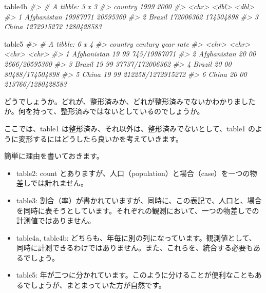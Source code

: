 \documentclass[
  xelatex, ja=standard]{bxjsbook}
\newenvironment{Shaded}{\begin{snugshade}}{\end{snugshade}}
\newcommand{\CommentTok}[1]{\textcolor[rgb]{0.56,0.35,0.01}{\textit{#1}}}
\newcommand{\NormalTok}[1]{#1}
\theoremstyle{definition}
\theoremstyle{definition}
\theoremstyle{definition}
\theoremstyle{definition}
\theoremstyle{remark}
\begin{document}
\begin{Shaded}
\begin{Highlighting}[]
\NormalTok{table4b}
\CommentTok{\#\textgreater{} \# A tibble: 3 x 3}
\CommentTok{\#\textgreater{}   country         \textasciigrave{}1999\textasciigrave{}     \textasciigrave{}2000\textasciigrave{}}
\CommentTok{\#\textgreater{}   \textless{}chr\textgreater{}            \textless{}dbl\textgreater{}      \textless{}dbl\textgreater{}}
\CommentTok{\#\textgreater{} 1 Afghanistan   19987071   20595360}
\CommentTok{\#\textgreater{} 2 Brazil       172006362  174504898}
\CommentTok{\#\textgreater{} 3 China       1272915272 1280428583}
\end{Highlighting}
\end{Shaded}

\begin{Shaded}
\begin{Highlighting}[]
\NormalTok{table5}
\CommentTok{\#\textgreater{} \# A tibble: 6 x 4}
\CommentTok{\#\textgreater{}   country     century year  rate             }
\CommentTok{\#\textgreater{}   \textless{}chr\textgreater{}       \textless{}chr\textgreater{}   \textless{}chr\textgreater{} \textless{}chr\textgreater{}            }
\CommentTok{\#\textgreater{} 1 Afghanistan 19      99    745/19987071     }
\CommentTok{\#\textgreater{} 2 Afghanistan 20      00    2666/20595360    }
\CommentTok{\#\textgreater{} 3 Brazil      19      99    37737/172006362  }
\CommentTok{\#\textgreater{} 4 Brazil      20      00    80488/174504898  }
\CommentTok{\#\textgreater{} 5 China       19      99    212258/1272915272}
\CommentTok{\#\textgreater{} 6 China       20      00    213766/1280428583}
\end{Highlighting}
\end{Shaded}

どうでしょうか。どれが、整形済みか、どれが整形済みでないかわかりましたか。何を持って、整形済みではないとしているのでしょうか。

ここでは、table1 は整形済み、それ以外は、整形済みでないとして、table1 のように変形するにはどうしたら良いかを考えていきます。

簡単に理由を書いておきます。

\begin{itemize}
\item
  table2: count とありますが、人口（population）と場合（case）を一つの物差しでは計れません。
\item
  table3: 割合（率）が書かれていますが、同時に、この表記で、人口と、場合を同時に表そうとしています。それぞれの観測において、一つの物差しでの計測値ではありません。
\item
  table4a, table4b: どちらも、年毎に別の列になっています。観測値として、同時に計測できるわけではありません。また、これらを、統合する必要もあるでしょう。
\item
  table5: 年が二つに分かれています。このように分けることが便利なこともあるでしょうが、まとまっていた方が自然です。
\end{itemize}
\end{document}
